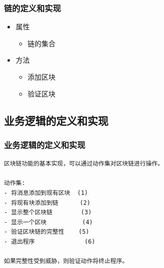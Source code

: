 \documentclass[11pt]{beamer}
\begin{document}
\begin{frame}[fragile]
	\frametitle{链的定义和实现}
	\begin{minipage}[t]{0.5\linewidth}
		\begin{itemize}
			\item 属性
			\begin{itemize}
				\item 链的集合
			\end{itemize}
			\item 方法
			\begin{itemize}
				\item 添加区块
				\item 验证区块
			\end{itemize}
		\end{itemize}
	\end{minipage}%
	\begin{minipage}[t]{0.4\linewidth}
		\begin{figure}
			\begin{center}
				\scriptsize\ttfamily
			\end{center}				
		\end{figure}
	\end{minipage}%
\end{frame}




\subsection{业务逻辑的定义和实现}
\begin{frame}[fragile]
	\frametitle{业务逻辑的定义和实现}
	\begin{lstlisting}[basicstyle=\small\ttfamily]
区块链功能的基本实现，可以通过动作集对区块链进行操作。

动作集:
- 将消息添加到现有区块  (1)
- 将现有块添加到链      (2)
- 显示整个区块链        (3)
- 显示一个区块          (4)
- 验证区块链的完整性    (5)
- 退出程序              (6)

如果完整性受到威胁，则验证动作将终止程序。
\end{lstlisting}
\end{frame}
\end{document}
